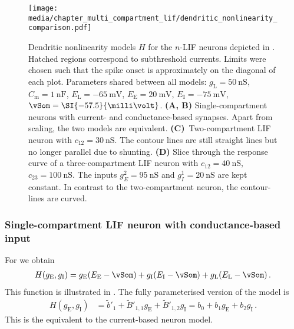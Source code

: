 \begin{figure}
	\texttt{[image: media/chapter\_multi\_compartment\_lif/dendritic\_nonlinearity\_comparison.pdf]}%
	{\label{fig:dendritic_nonlinearity_comparison_a}}%
	{\label{fig:dendritic_nonlinearity_comparison_b}}%
	{\label{fig:dendritic_nonlinearity_comparison_c}}%
	{\label{fig:dendritic_nonlinearity_comparison_d}}%
	\caption[Dendritic nonlinearity models $H$ for different $n$-LIF neurons]{Dendritic nonlinearity models $H$ for the $n$-LIF neurons depicted in . Hatched regions correspond to subthreshold currents. Limits were chosen such that the spike onset is approximately on the diagonal of each plot.
	Parameters shared between all models: $g_\mathrm{L} = \SI{50}{\nano\siemens}$, $C_\mathrm{m} = \SI{1}{\nano\farad}$, $E_\mathrm{L} = \SI{-65}{\milli\volt}$, $E_\mathrm{E} = \SI{20}{\milli\volt}$, $E_\mathrm{I} = \SI{-75}{\milli\volt}$, $\vSom = \SI{-57.5}{\milli\volt}$.
	\textbf{(A, B)} Single-compartment neurons with current- and conductance-based synapses. Apart from scaling, the two models are equivalent.
	\textbf{(C)}~Two-compartment LIF neuron with $c_\mathrm{12} = \SI{30}{\nano\siemens}$. The contour lines are still straight lines but no longer parallel due to shunting.
	\textbf{(D)} Slice through the response curve of a three-compartment LIF neuron with $c_\mathrm{12} = \SI{40}{\nano\siemens}$, $c_\mathrm{23} = \SI{100}{\nano\siemens}$. The inputs $g_E^2 = \SI{95}{\nano\siemens}$ and $g_I^1 = \SI{20}{\nano\siemens}$ are kept constant. In contrast to the two-compartment neuron, the contour-lines are curved.
	}
\end{figure}


\subsubsection{Single-compartment LIF neuron with conductance-based input}
For  we obtain
\begin{align*}
	H(g_\mathrm{E}, g_\mathrm{I}) = g_\mathrm{E} (E_\mathrm{E} - \vSom) + g_\mathrm{I} (E_\mathrm{I} - \vSom) + g_\mathrm{L}(E_\mathrm{L} - \vSom) \,.
\end{align*}
This function is illustrated in .
The fully parameterised version of the model is
\begin{align*}
	H(g_\mathrm{E}, g_\mathrm{I}) &= \tilde b'_1 + \tilde B'_{1, 1} g_\mathrm{E} + \tilde B'_{1, 2} g_\mathrm{I} = b_0 + b_1 g_\mathrm{E} + b_2 g_\mathrm{I} \,.
\end{align*}
This is the equivalent to the current-based neuron model.

